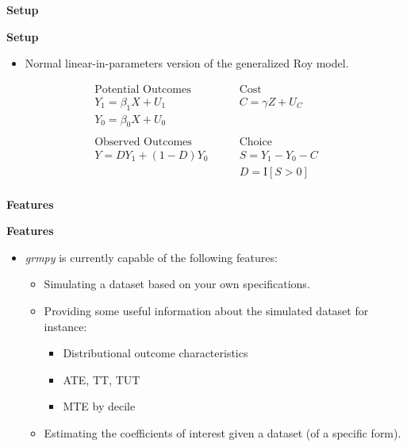 \begin{frame}\begin{center}
\LARGE\textbf{Setup}
\end{center}\end{frame}



\begin{frame}
\textbf{Setup}
\begin{itemize}\setlength\itemsep{1em}
\item Normal linear-in-parameters version of the generalized Roy model.
\end{itemize}
\begin{align*}
\text{Potential Outcomes} &\qquad \text{Cost} \\
Y_1 = \beta_1 X + U_1      &\qquad C = \gamma Z + U_C \\
Y_0 = \beta_0 X + U_0      &\qquad \\
    & \\
\text{Observed Outcomes}  &\qquad \text{Choice} \\
Y = D Y_1 + (1 - D)Y_0 &\qquad S = Y_1 - Y_0 - C \\
                       &\qquad D = \mathrm{I}[S > 0] \\
\end{align*}
\end{frame}

\begin{frame}\begin{center}
\LARGE\textbf{Features}
\end{center}\end{frame}

\begin{frame}
\textbf{Features}
\begin{itemize}\setlength\itemsep{1em}
\item \textit{grmpy} is currently capable of the following features:
\begin{itemize}\setlength\itemsep{1em}
  \item Simulating a dataset based on your own specifications.
  \item Providing some useful information about the simulated dataset for instance:
    \begin{itemize}\setlength\itemsep{1em}
    \item Distributional outcome characteristics
    \item ATE, TT, TUT
    \item MTE by decile
    \end{itemize}
  \item Estimating the coefficients of interest given a dataset (of a specific form).
\end{itemize}
\end{itemize}

\end{frame}

